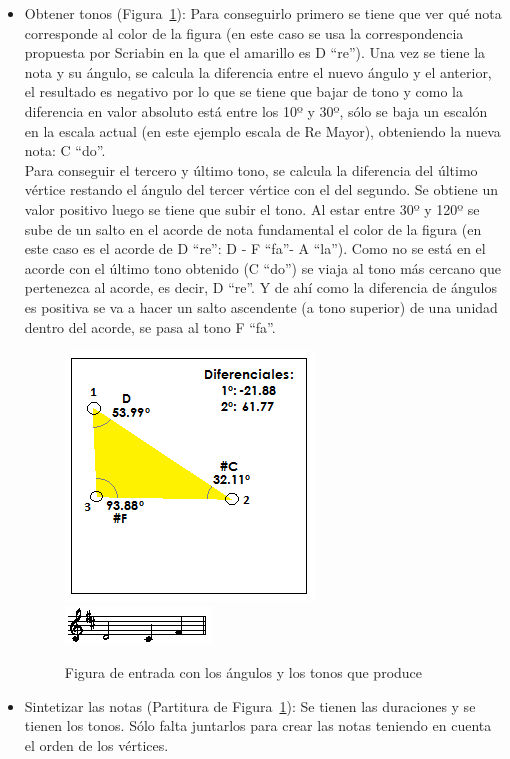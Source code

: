 \begin{itemize}
	\item Obtener tonos  (Figura~\ref{fig:Figura4Voz1}): Para conseguirlo primero se tiene que ver qué nota corresponde al color de la figura (en este caso se usa la correspondencia propuesta por Scriabin en la que el amarillo es D ``re''). Una vez se tiene la nota y su ángulo, se calcula la diferencia entre el nuevo ángulo y el anterior, el resultado es negativo por lo que se tiene que bajar de tono y como la diferencia en valor absoluto está entre los 10º y 30º, sólo se baja un escalón en la escala actual (en este ejemplo escala de Re Mayor), obteniendo la nueva nota: C ``do''. \\
Para conseguir el tercero y último tono, se calcula la diferencia del último vértice restando el ángulo del tercer vértice con el del segundo. Se obtiene un valor positivo luego se tiene que subir el tono. Al estar entre 30º y 120º se sube de un salto en el acorde de nota fundamental el color de la figura (en este caso es el acorde de D ``re'': D - F ``fa''- A ``la''). Como no se está en el acorde con el último tono obtenido (C ``do'') se viaja al tono más cercano que pertenezca al acorde, es decir, D ``re''. Y de ahí como la diferencia de ángulos es positiva se va a hacer un salto ascendente (a tono superior) de una unidad dentro del acorde, se pasa al tono F ``fa''.
	
		\begin{figure}[!htbp]
		\centering
		\hspace*{0.0in}
		\includegraphics[scale=1.0]{graphics/simpletest1-F3.png}
		\includegraphics[scale=1.0]{graphics/simpletest1-MELpartitura.png}
		\caption{Figura de entrada con los ángulos y los tonos que produce}
		\label{fig:Figura4Voz1}
		\end{figure}

	\item Sintetizar las notas (Partitura de Figura~\ref{fig:Figura4Voz1}): Se tienen las duraciones y se tienen los tonos. Sólo falta juntarlos para crear las notas teniendo en cuenta el orden de los vértices.\\

\end{itemize}

